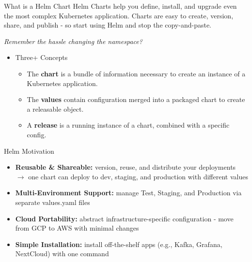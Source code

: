 \breakframe
{}

\begin{frame}{What is a Helm Chart}
  Helm Charts help you define, install, and upgrade even the most complex
  Kubernetes application. Charts are easy to create, version, share, and publish
  - so start using Helm and stop the copy-and-paste.
  \medskip

  \emph{Remember the hassle changing the namespace?}
  \begin{itemize}
    \item Three+ Concepts
      \begin{itemize}
        \item The \textbf{chart} is a bundle of information necessary to create an instance of a Kubernetes application.
        \item The \textbf{values} contain configuration merged into a packaged chart to create a releasable object.
        \item A \textbf{release} is a running instance of a chart, combined with a specific config.
      \end{itemize}
  \end{itemize}
\end{frame}

\begin{frame}{Helm Motivation}
  \begin{itemize}
    \item \textbf{Reusable \& Shareable:} version, reuse, and distribute your deployments\\
      $\rightarrow$ one chart can deploy to dev, staging, and production with different values
    \item \textbf{Multi-Environment Support:} manage Test, Staging, and Production via separate values.yaml files
    \item \textbf{Cloud Portability:} abstract infrastructure-specific configuration - move from GCP to AWS with minimal changes
    \item \textbf{Simple Installation:} install off-the-shelf apps (e.g., Kafka, Grafana, NextCloud) with one command
  \end{itemize}
\end{frame}

